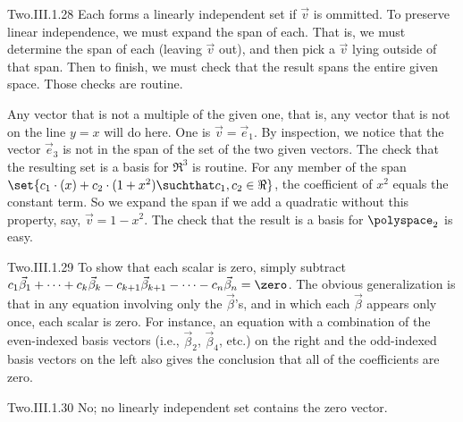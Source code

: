 \begin{ans}{Two.III.1.28}
      Each forms a linearly independent set if $\vec{v}$ is ommitted.
      To preserve linear independence, we must expand the span of each.
      That is, we must determine the span of each (leaving $\vec{v}$ out),
      and then pick a $\vec{v}$ lying outside of that span.
      Then to finish, we must check that the result spans the entire given
      space.
      Those checks are routine.
      \begin{exparts}
        \partsitem Any vector that is not a multiple of the given one,
          that is, any vector that is not on the line $y=x$ will do here.
          One is $\vec{v}=\vec{e}_1$.
        \partsitem By inspection, we notice that the vector $\vec{e}_3$ is
          not in the span of the set of the two given vectors.
          The check that the resulting set is a basis for $\Re^3$ is
          routine.
        \partsitem For any member of the span
          $\set{c_1\cdot(x)+c_2\cdot(1+x^2)\suchthat c_1,c_2\in\Re}$,
          the coefficient of $x^2$ equals the constant term.
          So we expand the span if we add a quadratic without this property,
          say, $\vec{v}=1-x^2$.
          The check that the result is a basis for $\polyspace_2$ is easy.
      \end{exparts}
    
\end{ans}
\begin{ans}{Two.III.1.29}
      To show that each scalar is zero, simply subtract
      \( c_1\vec{\beta}_1+\dots+c_k\vec{\beta}_k
          -c_{k+1}\vec{\beta}_{k+1}-\dots-c_n\vec{\beta}_n=\zero \).
      The obvious generalization is that in any equation involving only the
      \( \vec{\beta} \)'s, and in which each \( \vec{\beta} \) appears only
      once, each scalar is zero.
      For instance, an equation with a combination of
      the even-indexed basis vectors
      (i.e., $\vec{\beta}_2$, $\vec{\beta}_4$, etc.) on the right and the
      odd-indexed basis vectors on the left also gives the conclusion that
      all of the coefficients are zero.
    
\end{ans}
\begin{ans}{Two.III.1.30}
      No; no linearly independent set contains the zero vector.
    
\end{ans}
